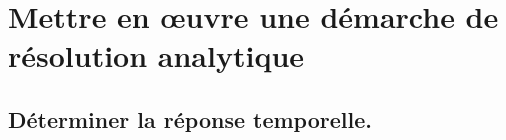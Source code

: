 \documentclass[10pt,fleqn]{article}
\newcommand{\repRel}{../..}
\newcommand{\repStyle}{\repRel/Style}
\newcommand{\td}{fichier_td}
\newcommand{\repExos}{\repRel/ExercicesCompetences}
\newcommand{\repExo}{dossier}
\begin{document}
\begin{multicols}{2}
\renewcommand{\repExo}{\repExos/C1_ProposerDemarche/C1_05_ProposerDemarcheActionMecaLoiMvt_PFS/STOCK/03_TT_02}
\renewcommand{\td}{03_TT_02}
\graphicspath{{\repStyle/png/}{\repExo/images/}}


\renewcommand{\repExo}{\repExos/C1_ProposerDemarche/C1_05_ProposerDemarcheActionMecaLoiMvt_PFS/STOCK/04_RR_02}
\renewcommand{\td}{04_RR_02}
\graphicspath{{\repStyle/png/}{\repExo/images/}}


\renewcommand{\repExo}{\repExos/C1_ProposerDemarche/C1_05_ProposerDemarcheActionMecaLoiMvt_PFS/STOCK/05_RT_02}
\renewcommand{\td}{05_RT_02}
\graphicspath{{\repStyle/png/}{\repExo/images/}}


\renewcommand{\repExo}{\repExos/C1_ProposerDemarche/C1_05_ProposerDemarcheActionMecaLoiMvt_PFS/STOCK/06_TR_02}
\renewcommand{\td}{06_TR_02}
\graphicspath{{\repStyle/png/}{\repExo/images/}}


\renewcommand{\repExo}{\repExos/C1_ProposerDemarche/C1_05_ProposerDemarcheActionMecaLoiMvt_PFS/STOCK/07_RR3D_02}
\renewcommand{\td}{07_RR3D_02}
\graphicspath{{\repStyle/png/}{\repExo/images/}}


\renewcommand{\repExo}{\repExos/C1_ProposerDemarche/C1_05_ProposerDemarcheActionMecaLoiMvt_PFS/STOCK/08_RR3D_02}
\renewcommand{\td}{08_RR3D_02}
\graphicspath{{\repStyle/png/}{\repExo/images/}}


\renewcommand{\repExo}{\repExos/C1_ProposerDemarche/C1_05_ProposerDemarcheActionMecaLoiMvt_PFS/STOCK/09_RT_RSG}
\renewcommand{\td}{09_RT_RSG}
\graphicspath{{\repStyle/png/}{\repExo/images/}}


\end{multicols}

\section{Mettre en œuvre une démarche de résolution analytique} 

\subsection{Déterminer la réponse temporelle.} 

\begin{multicols}{2} 

\end{multicols}
\end{document}
